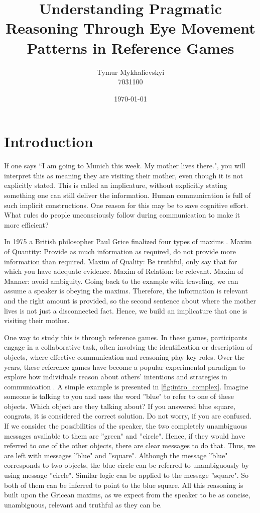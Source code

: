 \documentclass[11pt,a4paper]{article}
\title{Understanding Pragmatic Reasoning Through Eye Movement Patterns in Reference Games}
\date{\today}
\author{Tymur Mykhalievskyi \\ 7031100}
\begin{document}
\maketitle
\section{Introduction} \label{sec:intro}
If one says ``I am going to Munich this week. My mother lives there.", you will interpret this as meaning they are visiting their mother, even though it is not explicitly stated. This is called an implicature, without explicitly stating something one can still deliver the information. Human communication is full of such implicit constructions. One reason for this may be to save cognitive effort. What rules do people unconsciously follow during communication to make it more efficient?

In 1975 a British philosopher Paul Grice finalized four types of maxims \citep{Grice_1975}. Maxim of Quantity: Provide as much information as required, do not provide more information than required. Maxim of Quality: Be truthful, only say that for which you have adequate evidence. Maxim of Relation: be relevant. Maxim of Manner: avoid ambiguity. Going back to the example with traveling, we can assume a speaker is obeying the maxims. Therefore, the information is relevant and the right amount is provided, so the second sentence about where the mother lives is not just a disconnected fact. Hence, we build an implicature that one is visiting their mother.

 One way to study this is through reference games. In these games, participants engage in a collaborative task, often involving the identification or description of objects, where effective communication and reasoning play key roles. Over the years, these reference games have become a popular experimental paradigm to explore how individuals reason about others' intentions and strategies in communication \citep{Frank_2012,Franke_2016}. A simple example is presented in \autoref{fig:intro_complex}. Imagine someone is talking to you and uses the word ''blue" to refer to one of these objects. Which object are they talking about? If you answered blue square, congrats, it is considered the correct solution. Do not worry, if you are confused. If we consider the possibilities of the speaker, the two completely unambiguous messages available to them are ''green" and ''circle". Hence, if they would have referred to one of the other objects, there are clear messages to do that. Thus, we are left with messages ''blue" and ''square". Although the message ''blue" corresponds to two objects, the blue circle can be referred to unambiguously by using message ''circle". Similar logic can be applied to the message ''square". So both of them can be inferred to point to the blue square. All this reasoning is built upon the Gricean maxims, as we expect from the speaker to be as concise, unambiguous, relevant and truthful as they can be. 
\end{document}
